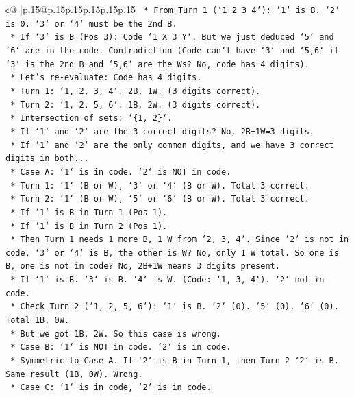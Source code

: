 \documentclass{article}
\begin{document}
{\begin{supertabular}{c@{$\;$}|p{.15\linewidth}@{}p{.15\linewidth}p{.15\linewidth}p{.15\linewidth}p{.15\linewidth}p{.15\linewidth}}
{{{\texttt{        *   From Turn 1 (`1 2 3 4`): `1` is B. `2` is 0. `3` or `4` must be the 2nd B.} \\
\texttt{        *   If `3` is B (Pos 3): Code `1 X 3 Y`. But we just deduced `5` and `6` are in the code. Contradiction (Code can't have `3` and `5,6` if `3` is the 2nd B and `5,6` are the Ws? No, code has 4 digits).} \\
\texttt{        *   Let's re{-}evaluate: Code has 4 digits.} \\
\texttt{        *   Turn 1: `1, 2, 3, 4`. 2B, 1W. (3 digits correct).} \\
\texttt{        *   Turn 2: `1, 2, 5, 6`. 1B, 2W. (3 digits correct).} \\
\texttt{        *   Intersection of sets: `\{1, 2\}`.} \\
\texttt{        *   If `1` and `2` are the 3 correct digits? No, 2B+1W=3 digits.} \\
\texttt{        *   If `1` and `2` are the only common digits, and we have 3 correct digits in both...} \\
\texttt{        *   Case A: `1` is in code. `2` is NOT in code.} \\
\texttt{            *   Turn 1: `1` (B or W), `3` or `4` (B or W). Total 3 correct.} \\
\texttt{            *   Turn 2: `1` (B or W), `5` or `6` (B or W). Total 3 correct.} \\
\texttt{            *   If `1` is B in Turn 1 (Pos 1).} \\
\texttt{            *   If `1` is B in Turn 2 (Pos 1).} \\
\texttt{            *   Then Turn 1 needs 1 more B, 1 W from `2, 3, 4`. Since `2` is not in code, `3` or `4` is B, the other is W? No, only 1 W total. So one is B, one is not in code? No, 2B+1W means 3 digits present.} \\
\texttt{            *   If `1` is B. `3` is B. `4` is W. (Code: `1, 3, 4`). `2` not in code.} \\
\texttt{            *   Check Turn 2 (`1, 2, 5, 6`): `1` is B. `2` (0). `5` (0). `6` (0). Total 1B, 0W.} \\
\texttt{            *   But we got 1B, 2W. So this case is wrong.} \\
\texttt{        *   Case B: `1` is NOT in code. `2` is in code.} \\
\texttt{            *   Symmetric to Case A. If `2` is B in Turn 1, then Turn 2 `2` is B. Same result (1B, 0W). Wrong.} \\
\texttt{        *   Case C: `1` is in code, `2` is in code.} \\
}}}
\end{supertabular}}
\end{document}

